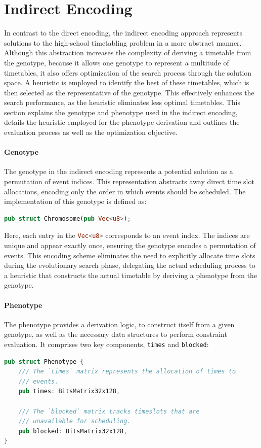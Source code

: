 \documentclass[english,examples]{isasthesis}
\begin{document}
\section{Indirect Encoding}
In contrast to the direct encoding, the indirect encoding
approach represents solutions to the high-school timetabling problem in a more
abstract manner.
Although this abstraction increases the complexity of deriving a timetable from
the genotype, because it allows one genotype to represent a multitude of
timetables, it also offers optimization of the search process through the
solution space.
A heuristic is employed to identify the best of these timetables, which is then
selected as the representative of the genotype.
This effectively enhances the search performance, as the heuristic eliminates
less optimal timetables.
%
This section explains the genotype and phenotype used in the indirect encoding,
details the heuristic employed for the phenotype derivation and outlines the
evaluation process as well as the optimization objective.

\paragraph{Genotype}
The genotype in the indirect encoding represents a potential solution as a
permutation of event indices. This representation abstracts away direct time
slot allocations, encoding only the order in which events should be scheduled.
The implementation of this genotype is defined as:
\begin{lstlisting}[language=Rust]
pub struct Chromosome(pub Vec<u8>);
\end{lstlisting}

Here, each entry in the \lstinline[language=Rust]{Vec<u8>} corresponds to an
event index. The indices are unique and appear exactly once, ensuring the
genotype encodes a permutation of events.
This encoding scheme eliminates the need to explicitly allocate time slots
during the evolutionary search phase, delegating the actual scheduling process
to a heuristic that constructs the actual timetable by deriving a phenotype
from the genotype.

\paragraph{Phenotype}
The phenotype provides a derivation logic, to construct itself from a given
genotype, as well as the necessary data structures to perform constraint
evaluation. It comprises two key components,
\lstinline[language=Rust]|times| and \lstinline[language=Rust]|blocked|:
\begin{lstlisting}[language=Rust]
pub struct Phenotype {
    /// The `times` matrix represents the allocation of times to
    /// events.
    pub times: BitsMatrix32x128,

    /// The `blocked` matrix tracks timeslots that are
    /// unavailable for scheduling.
    pub blocked: BitsMatrix32x128,
}
\end{lstlisting}
\end{document}
